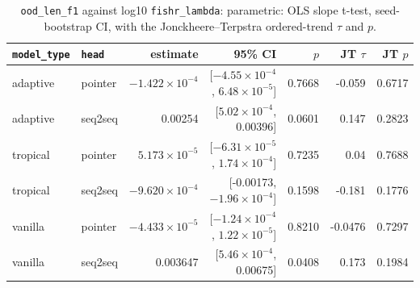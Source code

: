 \documentclass[10pt]{article}
\begin{document}
{\small
\begin{longtable}{llrrrrr}
\caption{\texttt{ood\_len\_f1} against log10 \texttt{fishr\_lambda}: parametric: OLS slope t-test, seed-bootstrap CI, with the Jonckheere--Terpstra ordered-trend $\tau$ and $p$.}\label{tab:trend-ood_len_f1}\\
\toprule
\texttt{model\_type} & \texttt{head} & estimate & 95\% CI & $p$ & JT $\tau$ & JT $p$\\
\midrule
\endhead
adaptive & pointer & $-1.422\times10^{-4}$ & [$-4.55\times10^{-4}$, $6.48\times10^{-5}$] & 0.7668 & -0.059 & 0.6717\\
adaptive & seq2seq & 0.00254 & [$5.02\times10^{-4}$, 0.00396] & 0.0601 & 0.147 & 0.2823\\
tropical & pointer & $5.173\times10^{-5}$ & [$-6.31\times10^{-5}$, $1.74\times10^{-4}$] & 0.7235 & 0.04 & 0.7688\\
tropical & seq2seq & $-9.620\times10^{-4}$ & [-0.00173, $-1.96\times10^{-4}$] & 0.1598 & -0.181 & 0.1776\\
vanilla & pointer & $-4.433\times10^{-5}$ & [$-1.24\times10^{-4}$, $1.22\times10^{-5}$] & 0.8210 & -0.0476 & 0.7297\\
vanilla & seq2seq & 0.003647 & [$5.46\times10^{-4}$, 0.00675] & 0.0408 & 0.173 & 0.1984\\
\bottomrule
\end{longtable}
}
\end{document}
